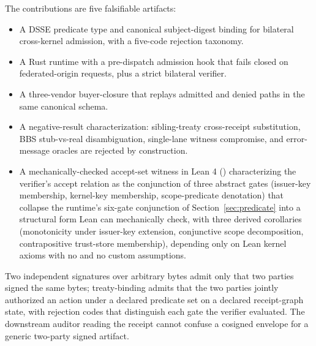 The contributions are five falsifiable artifacts:

\begin{itemize}
  \item A DSSE predicate type and canonical subject-digest binding for bilateral cross-kernel admission, with a five-code rejection taxonomy.
  \item A Rust runtime with a pre-dispatch admission hook that fails closed on federated-origin requests, plus a strict bilateral verifier.
  \item A three-vendor buyer-closure that replays admitted and denied paths in the same canonical schema.
  \item A negative-result characterization: sibling-treaty cross-receipt substitution, BBS stub-vs-real disambiguation, single-lane witness compromise, and error-message oracles are rejected by construction.
  \item A mechanically-checked accept-set witness in Lean 4 () characterizing the verifier's accept relation as the conjunction of three abstract gates (issuer-key membership, kernel-key membership, scope-predicate denotation) that collapse the runtime's six-gate conjunction of Section~\ref{sec:predicate} into a structural form Lean can mechanically check, with three derived corollaries (monotonicity under issuer-key extension, conjunctive scope decomposition, contrapositive trust-store membership), depending only on Lean kernel axioms with no  and no custom assumptions.
\end{itemize}

Two independent signatures over arbitrary bytes admit only that two parties signed the same bytes; treaty-binding admits that the two parties jointly authorized an action under a declared predicate set on a declared receipt-graph state, with rejection codes that distinguish each gate the verifier evaluated. The downstream auditor reading the receipt cannot confuse a cosigned envelope for a generic two-party signed artifact.
